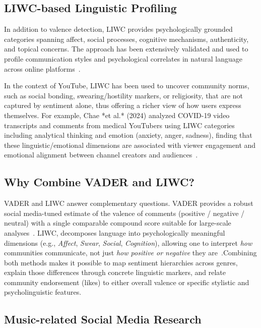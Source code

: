 \subsection*{LIWC-based Linguistic Profiling}

In addition to valence detection, LIWC provides psychologically grounded categories spanning affect, social processes, cognitive mechanisms, authenticity, and topical concerns. The approach has been extensively validated and used to profile communication styles and psychological correlates in natural language across online platforms~\cite{tausczik2010psychological,pennebaker2015liwc}. 

In the context of YouTube, LIWC has been used to uncover community norms, such as social bonding, swearing/hostility markers, or religiosity, that are not captured by sentiment alone, thus offering a richer view of how users express themselves. For example, Chae *et al.* (2024) analyzed COVID-19 video transcripts and comments from medical YouTubers using LIWC categories including analytical thinking and emotion (anxiety, anger, sadness), finding that these linguistic/emotional dimensions are associated with viewer engagement and emotional alignment between channel creators and audiences~\cite{chae2024being}.

\subsection*{Why Combine VADER and LIWC?}

VADER and LIWC answer complementary questions. VADER provides a robust social media-tuned estimate of the valence of comments (positive / negative / neutral) with a single comparable compound score suitable for large-scale analyses~\cite{hutto2014vader}. LIWC, decomposes language into psychologically meaningful dimensions (e.g., \textit{Affect}, \textit{Swear}, \textit{Social}, \textit{Cognition}), allowing one to interpret \emph{how} communities communicate, not just \emph{how positive or negative} they are~\cite{pennebaker2015liwc}.Combining both methods makes it possible to map sentiment hierarchies across genres, 
explain those differences through concrete linguistic markers, 
and relate community endorsement (likes) to either overall valence or specific stylistic and psycholinguistic features.


\subsection*{Music-related Social Media Research}

